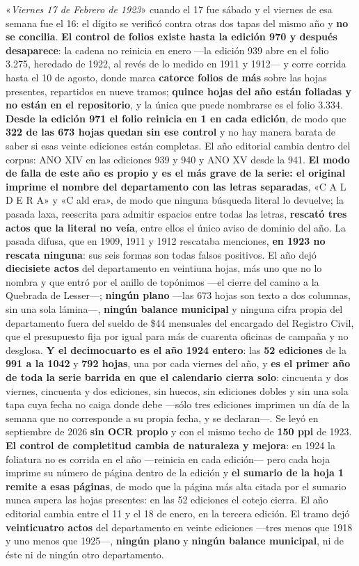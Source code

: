 «\textit{Viernes 17 de Febrero de 1923}» cuando el 17 fue sábado y el viernes de esa semana fue el 16: el dígito se verificó contra otras dos tapas del mismo año y \textbf{no se concilia}. \textbf{El control de folios existe hasta la edición 970 y después desaparece}: la cadena no reinicia en enero ---la edición 939 abre en el folio 3.275, heredado de 1922, al revés de lo medido en 1911 y 1912--- y corre corrida hasta el 10 de agosto, donde marca \textbf{catorce folios de más} sobre las hojas presentes, repartidos en nueve tramos; \textbf{quince hojas del año están foliadas y no están en el repositorio}, y la única que puede nombrarse es el folio 3.334. \textbf{Desde la edición 971 el folio reinicia en 1 en cada edición}, de modo que \textbf{322 de las 673 hojas quedan sin ese control} y no hay manera barata de saber si esas veinte ediciones están completas. El año editorial cambia dentro del corpus: ANO XIV en las ediciones 939 y 940 y ANO XV desde la 941. \textbf{El modo de falla de este año es propio y es el más grave de la serie: el original imprime el nombre del departamento con las letras separadas}, «C A L D E R A» y «C ald era», de modo que ninguna búsqueda literal lo devuelve; la pasada laxa, reescrita para admitir espacios entre todas las letras, \textbf{rescató tres actos que la literal no veía}, entre ellos el único aviso de dominio del año. La pasada difusa, que en 1909, 1911 y 1912 rescataba menciones, \textbf{en 1923 no rescata ninguna}: sus seis formas son todas falsos positivos. El año dejó \textbf{diecisiete actos} del departamento en veintiuna hojas, más uno que no lo nombra y que entró por el anillo de topónimos ---el cierre del camino a la Quebrada de Lesser---; \textbf{ningún plano} ---las 673 hojas son texto a dos columnas, sin una sola lámina---, \textbf{ningún balance municipal} y ninguna cifra propia del departamento fuera del sueldo de \$44 mensuales del encargado del Registro Civil, que el presupuesto fija por igual para más de cuarenta oficinas de campaña y no desglosa. \textbf{Y el decimocuarto es el año 1924 entero}: las \textbf{52 ediciones} de la \textbf{991 a la 1042} y \textbf{792 hojas}, una por cada viernes del año, y \textbf{es el primer año de toda la serie barrida en que el calendario cierra solo}: cincuenta y dos viernes, cincuenta y dos ediciones, sin huecos, sin ediciones dobles y sin una sola tapa cuya fecha no caiga donde debe ---sólo tres ediciones imprimen un día de la semana que no corresponde a su propia fecha, y se declaran---. Se leyó en septiembre de 2026 \textbf{sin OCR propio} y con el mismo techo de \textbf{150 ppi} de 1923. \textbf{El control de completitud cambia de naturaleza y mejora}: en 1924 la foliatura no es corrida en el año ---reinicia en cada edición--- pero cada hoja imprime su número de página dentro de la edición y \textbf{el sumario de la hoja 1 remite a esas páginas}, de modo que la página más alta citada por el sumario nunca supera las hojas presentes: en las 52 ediciones el cotejo cierra. El año editorial cambia entre el 11 y el 18 de enero, en la tercera edición. El tramo dejó \textbf{veinticuatro actos} del departamento en veinte ediciones ---tres menos que 1918 y uno menos que 1925---, \textbf{ningún plano} y \textbf{ningún balance municipal}, ni de éste ni de ningún otro departamento. 